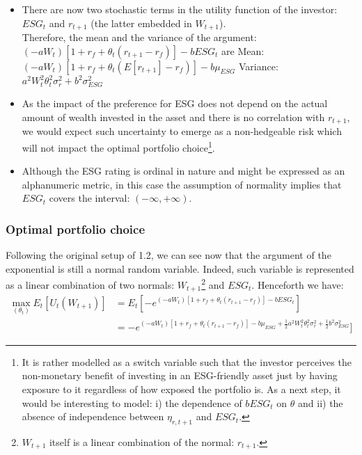 \documentclass[12pt]{article}
\begin{document}
	\begin{itemize}
		\item There are now two stochastic terms in the utility function of the investor: $ESG_t$ and $r_{t+1}$ (the latter embedded in $W_{t+1}$).\\ Therefore, the mean and the variance of the argument: $(-aW_t) [1 + r_f + \theta_t(r_{t+1}-r_f)] - bESG_t$ are
		\subitem Mean: $(-aW_t) [1 + r_f + \theta_t(E[r_{t+1}]-r_f)] - b\mu_{ESG}$
		\subitem Variance: $a^2W_t^2\theta_t^2\sigma_r^2 + b^2\sigma_{ESG}^2$
		\item As the impact of the preference for ESG does not depend on the actual amount of wealth invested in the asset and there is no correlation with $r_{t+1}$, we would expect such uncertainty to emerge as a non-hedgeable risk which will not impact the optimal portfolio choice\footnote {It is rather modelled as a switch variable such that the investor perceives the non-monetary benefit of investing in an ESG-friendly asset just by having exposure to it regardless of how exposed the portfolio is. As a next step, it would be interesting to model: i) the dependence of $bESG_t$ on $\theta$ and ii) the absence of independence between $\eta_{r, t+1}$ and $ESG_t$.}.
		\item Although the ESG rating is ordinal in nature and might be expressed as an alphanumeric metric, in this case the assumption of normality implies that $ESG_t$ covers the interval: $(-\infty,+\infty )$.
	\end{itemize}
	
	\subsubsection{Optimal portfolio choice}
	Following the original setup of 1.2, we can see now that the argument of the exponential is still a normal random variable. Indeed, such variable is represented as a linear combination of two normals: $W_{t+1}$\footnote{$W_{t+1}$ itself is a linear combination of the normal: $r_{t+1}$.} and $ESG_t$. Henceforth we have: 
	\begin{align*}
		\max_{(\theta_t)} E_t[U_{t}(W_{t+1})] &= E_t[-e^{(-aW_t) [1 + r_f + \theta_t(r_{t+1}-r_f)] - bESG_t}] \\
		&= -e^{(-aW_t) [1 + r_f + \theta_t(r_{t+1}-r_f)] - b\mu_{ESG} +\frac{1}{2}a^2W_t^2\theta_t^2\sigma_r^2 + \frac{1}{2}b^2\sigma_{ESG}^2}]
	\end{align*} \vspace{-2em}
	
\end{document}
